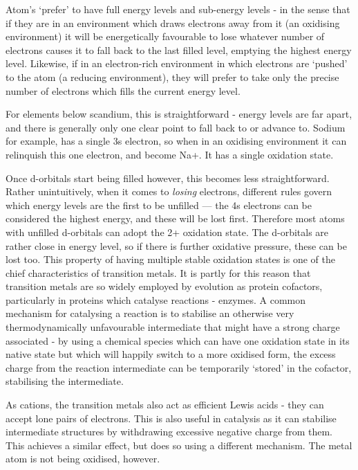 Atom's `prefer' to have full energy levels and sub-energy levels - in the sense that if they are in an environment which draws electrons away from it (an oxidising environment) it will be energetically favourable to lose whatever number of electrons causes it to fall back to the last filled level, emptying the highest energy level. Likewise, if in an electron-rich environment in which electrons are `pushed' to the atom (a reducing environment), they will prefer to take only the precise number of electrons which fills the current energy level.

For elements below scandium, this is straightforward - energy levels are far apart, and there is generally only one clear point to fall back to or advance to. Sodium for example, has a single 3s electron, so when in an oxidising environment it can relinquish this one electron, and become Na+. It has a single oxidation state.

Once d-orbitals start being filled however, this becomes less straightforward. Rather unintuitively, when it comes to \emph{losing} electrons, different rules govern which energy levels are the first to be unfilled --- the 4s electrons can be considered the highest energy, and these will be lost first. Therefore most atoms with unfilled d-orbitals can adopt the 2+ oxidation state. The d-orbitals are rather close in energy level, so if there is further oxidative pressure, these can be lost too. This property of having multiple stable oxidation states is one of the chief characteristics of transition metals. It is partly for this reason that transition metals are so widely employed by evolution as protein cofactors, particularly in proteins which catalyse reactions - enzymes. A common mechanism for catalysing a reaction is to stabilise an otherwise very thermodynamically unfavourable intermediate that might have a strong charge associated - by using a chemical species which can have one oxidation state in its native state but which will happily switch to a more oxidised form, the excess charge from the reaction intermediate can be temporarily `stored' in the cofactor, stabilising the intermediate.

As cations, the transition metals also act as efficient Lewis acids - they can accept lone pairs of electrons. This is also useful in catalysis as it can stabilise intermediate structures by withdrawing excessive negative charge from them. This achieves a similar effect, but does so using a different mechanism. The metal atom is not being oxidised, however.


